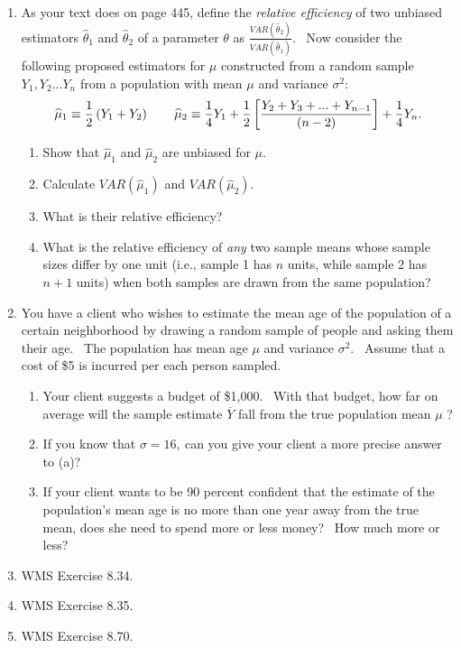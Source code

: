 \documentclass[11pt]{article}
\begin{document}
\begin{enumerate}
\item As your text does on page 445, define the \textit{relative efficiency }%
of two unbiased estimators $\widehat{\theta }_{1}$ and $\widehat{\theta }_{2}
$ of a parameter $\theta $ as $\frac{VAR\left( \widehat{\theta }_{2}\right) 
}{VAR\left( \widehat{\theta }_{1}\right) }.$ \ Now consider the following
proposed estimators for $\mu $ constructed from a random sample $%
Y_{1},Y_{2}...Y_{n}$ from a population with mean $\mu $ and variance $\sigma
^{2}:$%
\begin{equation*}
\widehat{\mu }_{1}\equiv \frac{1}{2}\left( Y_{1}+Y_{2}\right) \qquad 
\widehat{\mu }_{2}\equiv \frac{1}{4}Y_{1}+\frac{1}{2}\left[ \frac{%
Y_{2}+Y_{3}+...+Y_{n-1}}{\left( n-2\right) }\right] +\frac{1}{4}Y_{n}.
\end{equation*}

\begin{enumerate}
\item Show that $\widehat{\mu }_{1}$ and $\widehat{\mu }_{2}$ are unbiased
for $\mu .$

\item Calculate $VAR\left( \widehat{\mu }_{1}\right) $ and $VAR\left( 
\widehat{\mu }_{2}\right) .$

\item What is their relative efficiency?

\item What is the relative efficiency of \textit{any} two sample means whose
sample sizes differ by one unit (i.e., sample 1 has $n$ units, while sample
2 has $n+1$ units) when both samples are drawn from the same population?
\end{enumerate}

\item You have a client who wishes to estimate the mean age of the
population of a certain neighborhood by drawing a random sample of people
and asking them their age. \ The population has mean age $\mu $ and variance 
$\sigma ^{2}.$ \ Assume that a cost of \$5 is incurred per each person
sampled.

\begin{enumerate}
\item Your client suggests a budget of \$1,000. \ With that budget, how far
on average will the sample estimate $\overline{Y}$ fall from the true
population mean $\mu $ ?

\item If you know that $\sigma =16,\ $can you give your client a more
precise answer to (a)?

\item If your client wants to be 90 percent confident that the estimate of
the population's mean age is no more than one year away from the true mean,
does she need to spend more or less money? \ How much more or less?
\end{enumerate}

\item WMS Exercise 8.34.

\item WMS Exercise 8.35.

\item WMS Exercise 8.70.
\end{enumerate}
\end{document}
